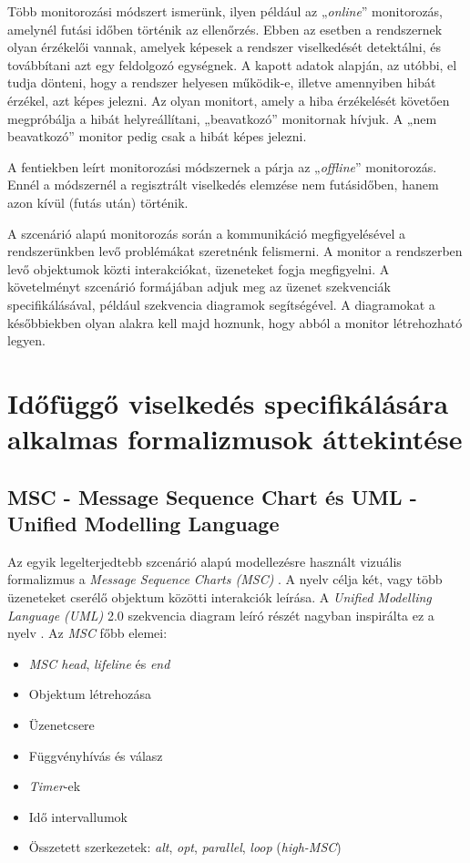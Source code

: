 Több monitorozási módszert ismerünk, ilyen például az „\textit{online}” \cite{RuntimeVerification1} monitorozás, amelynél futási időben történik az ellenőrzés.
Ebben az esetben a rendszernek olyan érzékelői vannak, amelyek képesek a rendszer viselkedését detektálni, és továbbítani azt egy feldolgozó egységnek.
A kapott adatok alapján, az utóbbi, el tudja dönteni, hogy a rendszer helyesen működik-e, illetve amennyiben hibát érzékel, azt képes jelezni.
Az olyan monitort, amely a hiba érzékelését követően megpróbálja a hibát helyreállítani, „beavatkozó” monitornak hívjuk.
A „nem beavatkozó” monitor pedig csak a hibát képes jelezni.

A fentiekben leírt monitorozási módszernek a párja az „\textit{offline}” \cite{RuntimeVerification1} monitorozás.
Ennél a módszernél a regisztrált viselkedés elemzése nem futásidőben, hanem azon kívül (futás után) történik.

A szcenárió alapú monitorozás során a kommunikáció megfigyelésével a rendszerünkben levő problémákat szeretnénk felismerni.
A monitor a rendszerben levő objektumok közti interakciókat, üzeneteket fogja megfigyelni.
A követelményt szcenárió formájában adjuk meg az üzenet szekvenciák specifikálásával, például szekvencia diagramok segítségével.
A diagramokat a későbbiekben olyan alakra kell majd hoznunk, hogy abból a monitor létrehozható legyen.

\section{Időfüggő viselkedés specifikálására alkalmas formalizmusok áttekintése}
\subsection{MSC - Message Sequence Chart és UML - Unified Modelling Language}

Az egyik legelterjedtebb szcenárió alapú modellezésre használt vizuális formalizmus a \textit{Message Sequence Charts (MSC)} \cite{MSC1}.
A nyelv célja két, vagy több üzeneteket cserélő objektum közötti interakciók leírása.
A \textit{Unified Modelling Language (UML)} 2.0 \cite{UML1} szekvencia diagram leíró részét nagyban inspirálta ez a nyelv \cite{MSC1}.
Az \textit{MSC} főbb elemei:

\begin{itemize}
\item \textit{MSC head}, \textit{lifeline} és \textit{end}
\item Objektum létrehozása
\item Üzenetcsere
\item Függvényhívás és válasz
\item \textit{Timer}-ek
\item Idő intervallumok
\item Összetett szerkezetek: \textit{alt}, \textit{opt}, \textit{parallel}, \textit{loop} (\textit{high-MSC})
\end{itemize}

